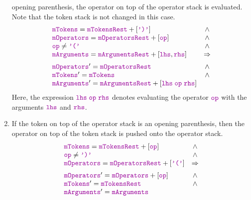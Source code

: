 \begin{enumerate}
      opening parenthesis,  the operator on top of the operator stack is evaluated.  Note that the token stack
      is not changed in this case. 
    $$\begin{array}{lc}
        \mytt{mTokens} = \mytt{mTokensRest} + [\mytt{')'} ] & \wedge \\
        \mytt{mOperators} = \mytt{mOperatorsRest} + [\mytt{op}] & \wedge \\
        \mytt{op} \not= \mytt{'('} & \wedge \\
        \mytt{mArguments} = \mytt{mArgumentsRest} + [\mytt{lhs}, \mytt{rhs}] & \Rightarrow \\[0.2cm]
        \mytt{mOperators}' = \mytt{mOperatorsRest} & \wedge \\
        \mytt{mTokens}' = \mytt{mTokens} & \wedge \\
        \mytt{mArguments}' = \mytt{mArgumentsRest} + [\mytt{lhs} \;\mytt{op}\; \mytt{rhs}]
        \end{array} 
      $$
      Here, the expression $\mytt{lhs} \;\mytt{op}\; \mytt{rhs}$ denotes evaluating the operator $\mytt{op}$ with the arguments
      $\mytt{lhs}$ and $\mytt{rhs}$.
\item If the token on top of the operator stack is an opening parenthesis, then the operator on top of the token stack
      is pushed onto the operator stack.
    $$\begin{array}{lc}
        \mytt{mTokens} = \mytt{mTokensRest} + [\mytt{op}] & \wedge \\
        \mytt{op} \not= \mytt{')'}                          & \wedge \\
        \mytt{mOperators} = \mytt{mOperatorsRest} + [\mytt{'('}] & \Rightarrow \\[0.2cm]
        \mytt{mOperators}' = \mytt{mOperators} + [\mytt{op}] & \wedge \\
        \mytt{mTokens}' = \mytt{mTokensRest} & \wedge \\
        \mytt{mArguments}' = \mytt{mArguments}
        \end{array} 
      $$
   

\end{enumerate}
